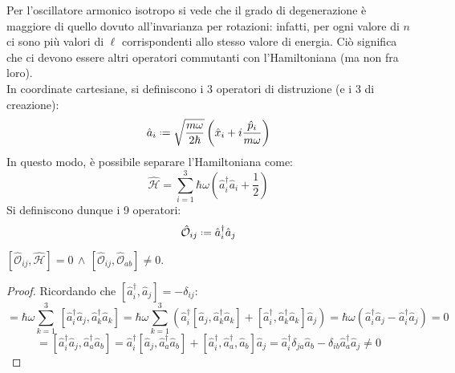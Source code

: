 Per l'oscillatore armonico isotropo si vede che il grado di degenerazione è maggiore di quello dovuto all'invarianza per rotazioni: infatti, per ogni valore di $ n $ ci sono più valori di $ \ell $ corrispondenti allo stesso valore di energia. Ciò significa che ci devono essere altri operatori commutanti con l'Hamiltoniana (ma non fra loro).\\
In coordinate cartesiane, si definiscono i 3 operatori di distruzione (e i 3 di creazione):
\begin{equation}
	\hat{a}_i \defeq \sqrt{\frac{m \omega}{2\hbar}} \left( \hat{x}_i + i \frac{\hat{p}_i}{m\omega} \right)
	\label{eq:3.38}
\end{equation}
In questo modo, è possibile separare l'Hamiltoniana come:
\begin{equation}
	\hat{\mathcal{H}} = \sum_{i = 1}^{3} \hbar \omega \left( \hat{a}_i^{\dagger} \hat{a}_i + \frac{1}{2} \right)
	\label{eq:3.39}
\end{equation}
Si definiscono dunque i 9 operatori:
\begin{equation}
	\hat{\mathcal{O}}_{ij} \defeq \hat{a}_i^{\dagger} \hat{a}_j
	\label{eq:3.40}
\end{equation}
\begin{proposition}
	$ [\hat{\mathcal{O}}_{ij}, \hat{\mathcal{H}}] = 0 \,\land\, [\hat{\mathcal{O}}_{ij}, \hat{\mathcal{O}}_{ab}] \neq 0 $.
\end{proposition}
\begin{proof}
	Ricordando che $ [\hat{a}_i^{\dagger},\hat{a}_j] = -\delta_{ij} $:
	\begin{equation*}
		[ \hat{\mathcal{O}}_{ij}, \hat{\mathcal{H}} ] = \hbar \omega \sum_{k = 1}^{3} \,[\hat{a}_i^{\dagger}\hat{a}_j,\hat{a}_k^{\dagger}\hat{a}_k] = \hbar \omega \sum_{k = 1}^{3} \left( \hat{a}_i^{\dagger} [\hat{a}_j,\hat{a}_k^{\dagger}\hat{a}_k] + [\hat{a}_i^{\dagger},\hat{a}_k^{\dagger}\hat{a}_k]\hat{a}_j \right) = \hbar \omega \left( \hat{a}_i^{\dagger} \hat{a}_j - \hat{a}_i^{\dagger} \hat{a}_j \right) = 0
	\end{equation*}
	\begin{equation*}
		[\hat{\mathcal{O}}_{ij},\hat{\mathcal{O}}_{ab}] = [\hat{a}_i^{\dagger}\hat{a}_j,\hat{a}_a^{\dagger}\hat{a}_b] = \hat{a}_i^{\dagger} [\hat{a}_{j},\hat{a}_a^{\dagger}\hat{a}_b] + [\hat{a}_i^{\dagger},\hat{a}_a^{\dagger},\hat{a}_b]\hat{a}_j = \hat{a}_i^{\dagger} \delta_{ja} \hat{a}_b - \delta_{ib} \hat{a}_a^{\dagger} \hat{a}_j \neq 0
	\end{equation*}
\end{proof}
